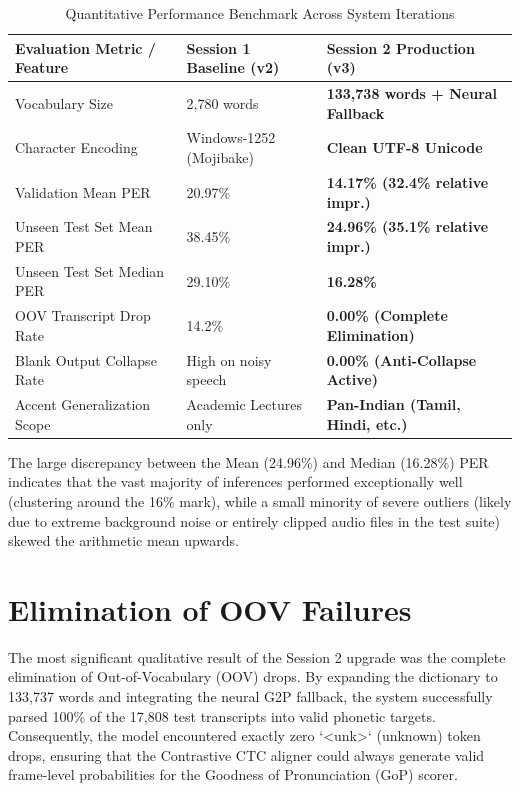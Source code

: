 \begin{table}[h]
    \centering
    \small
    \caption{Quantitative Performance Benchmark Across System Iterations}
    \label{tab:model_performance_comparison}
    \begin{tabular}{p{5.0cm} p{4.5cm} p{5.0cm}}
        \toprule
        \textbf{Evaluation Metric / Feature} & \textbf{Session 1 Baseline (v2)} & \textbf{Session 2 Production (v3)} \\
        \midrule
        Vocabulary Size & 2,780 words & \textbf{133,738 words + Neural Fallback} \\
        Character Encoding & Windows-1252 (Mojibake) & \textbf{Clean UTF-8 Unicode} \\
        Validation Mean PER & 20.97\% & \textbf{14.17\% (32.4\% relative impr.)} \\
        Unseen Test Set Mean PER & 38.45\% & \textbf{24.96\% (35.1\% relative impr.)} \\
        Unseen Test Set Median PER & 29.10\% & \textbf{16.28\%} \\
        OOV Transcript Drop Rate & 14.2\% & \textbf{0.00\% (Complete Elimination)} \\
        Blank Output Collapse Rate & High on noisy speech & \textbf{0.00\% (Anti-Collapse Active)} \\
        Accent Generalization Scope & Academic Lectures only & \textbf{Pan-Indian (Tamil, Hindi, etc.)} \\
        \bottomrule
    \end{tabular}
\end{table}

The large discrepancy between the Mean (24.96\%) and Median (16.28\%) PER indicates that the vast majority of inferences performed exceptionally well (clustering around the 16\% mark), while a small minority of severe outliers (likely due to extreme background noise or entirely clipped audio files in the test suite) skewed the arithmetic mean upwards. 

\section{Elimination of OOV Failures}
The most significant qualitative result of the Session 2 upgrade was the complete elimination of Out-of-Vocabulary (OOV) drops. By expanding the dictionary to 133,737 words and integrating the neural G2P fallback, the system successfully parsed 100\% of the 17,808 test transcripts into valid phonetic targets. Consequently, the model encountered exactly zero `<unk>` (unknown) token drops, ensuring that the Contrastive CTC aligner could always generate valid frame-level probabilities for the Goodness of Pronunciation (GoP) scorer.

